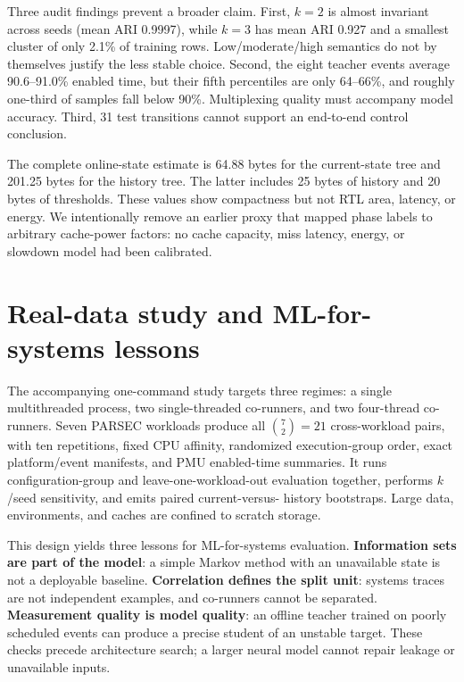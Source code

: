 \documentclass{article}
\begin{document}
Three audit findings prevent a broader claim. First, $k=2$ is almost invariant across
seeds (mean ARI 0.9997), while $k=3$ has mean ARI 0.927 and a smallest cluster of only
2.1\% of training rows. Low/moderate/high semantics do not by themselves justify the
less stable choice. Second, the eight teacher events average 90.6--91.0\% enabled
time, but their fifth percentiles are only 64--66\%, and roughly one-third of samples
fall below 90\%. Multiplexing quality must accompany model accuracy. Third, 31 test
transitions cannot support an end-to-end control conclusion.

The complete online-state estimate is 64.88 bytes for the current-state tree and
201.25 bytes for the history tree. The latter includes 25 bytes of history and 20
bytes of thresholds. These values show compactness but not RTL area, latency, or
energy. We intentionally remove an earlier proxy that mapped phase labels to arbitrary
cache-power factors: no cache capacity, miss latency, energy, or slowdown model had
been calibrated.

\section{Real-data study and ML-for-systems lessons}

The accompanying one-command study targets three regimes: a single multithreaded
process, two single-threaded co-runners, and two four-thread co-runners. Seven PARSEC
workloads produce all $\binom{7}{2}=21$ cross-workload pairs, with ten repetitions,
fixed CPU affinity, randomized execution-group order, exact platform/event manifests,
and PMU enabled-time summaries. It runs configuration-group and leave-one-workload-out
evaluation together, performs $k$/seed sensitivity, and emits paired current-versus-
history bootstraps. Large data, environments, and caches are confined to scratch
storage.

This design yields three lessons for ML-for-systems evaluation. \textbf{Information
sets are part of the model}: a simple Markov method with an unavailable state is not a
deployable baseline. \textbf{Correlation defines the split unit}: systems traces are
not independent examples, and co-runners cannot be separated. \textbf{Measurement
quality is model quality}: an offline teacher trained on poorly scheduled events can
produce a precise student of an unstable target. These checks precede architecture
search; a larger neural model cannot repair leakage or unavailable inputs.
\end{document}
